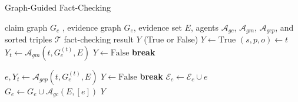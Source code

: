 \begin{algorithm}[ht]
\caption{Graph-Guided Fact-Checking}
\label{alg:1}
\begin{algorithmic}
\REQUIRE claim graph \( G_c \) , evidence graph \( G_e \), evidence set \(E\), agents $\mathcal{A}_{gc}$, $\mathcal{A}_{gm}$, $\mathcal{A}_{gcp}$, and sorted triples $\mathcal{T}$
\ENSURE fact-checking result $Y$ (True or False)
\STATE \( Y \leftarrow \text{True} \)
    \STATE \( (s, p, o) \leftarrow t \)
            \STATE \(Y_{t} \leftarrow \mathcal{A}_{gm}(t, G^{(t)}_e, E)\)
            \STATE \( Y \leftarrow \text{False} \)
            \STATE \textbf{break}
        \ENDIF
        
    \ELSE
        \STATE \( e, Y_{t} \leftarrow \mathcal{A}_{gcp}(t, G^{(t)}_e, E) \)
            \STATE \( Y \leftarrow \text{False} \)
            \STATE \textbf{break}
        \ELSE
            \STATE \( \mathcal{E}_c \leftarrow \mathcal{E}_c \cup e \)
            \STATE \( G_e \leftarrow G_e \cup \mathcal{A}_{gc}(E, [e]) \)
        \ENDIF
    \ENDIF
\ENDFOR
\RETURN \( Y \)
\end{algorithmic}
\end{algorithm}


